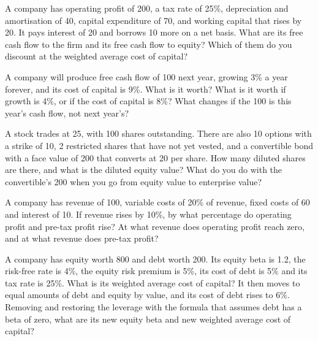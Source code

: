 \begin{question}\label{iq:iv2:valuation-and-financial-statements:4}
A company has operating profit of 200, a tax rate of 25\%, depreciation and amortisation of 40, capital expenditure of 70, and working capital that rises by 20. It pays interest of 20 and borrows 10 more on a net basis. What are its free cash flow to the firm and its free cash flow to equity? Which of them do you discount at the weighted average cost of capital?
\end{question}

\begin{question}\label{iq:iv2:valuation-and-financial-statements:5}
A company will produce free cash flow of 100 next year, growing 3\% a year forever, and its cost of capital is 9\%. What is it worth? What is it worth if growth is 4\%, or if the cost of capital is 8\%? What changes if the 100 is this year's cash flow, not next year's?
\end{question}

\begin{question}\label{iq:iv2:valuation-and-financial-statements:6}
A stock trades at 25, with 100 shares outstanding. There are also 10 options with a strike of 10, 2 restricted shares that have not yet vested, and a convertible bond with a face value of 200 that converts at 20 per share. How many diluted shares are there, and what is the diluted equity value? What do you do with the convertible's 200 when you go from equity value to enterprise value?
\end{question}

\begin{question}\label{iq:iv2:valuation-and-financial-statements:7}
A company has revenue of 100, variable costs of 20\% of revenue, fixed costs of 60 and interest of 10. If revenue rises by 10\%, by what percentage do operating profit and pre-tax profit rise? At what revenue does operating profit reach zero, and at what revenue does pre-tax profit?
\end{question}

\begin{question}\label{iq:iv2:valuation-and-financial-statements:8}
A company has equity worth 800 and debt worth 200. Its equity beta is 1.2, the risk-free rate is 4\%, the equity risk premium is 5\%, its cost of debt is 5\% and its tax rate is 25\%. What is its weighted average cost of capital? It then moves to equal amounts of debt and equity by value, and its cost of debt rises to 6\%. Removing and restoring the leverage with the formula that assumes debt has a beta of zero, what are its new equity beta and new weighted average cost of capital?
\end{question}

